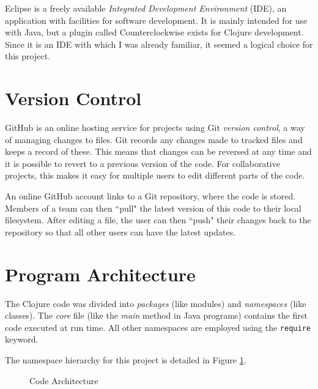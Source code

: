 Eclipse is a freely available \textit{Integrated Development Environment} (IDE), an application with facilities for software development. It is mainly intended for use with Java, but a plugin called Counterclockwise exists for Clojure development. Since it is an IDE with which I was already familiar, it seemed a logical choice for this project. 

\section{Version Control}

GitHub is an online hosting service for projects using Git \textit{version control}, a way of managing changes to files. Git records any changes made to tracked files and keeps a record of these. This means that changes can be reversed at any time and it is possible to revert to a previous version of the code. For collaborative projects, this makes it easy for multiple users to edit different parts of the code. 

An online GitHub account links to a Git repository, where the code is stored. Members of a team can then ``pull" the latest version of this code to their local filesystem. After editing a file, the user can then ``push" their changes back to the repository so that all other users can have the latest updates. 

\section{Program Architecture}

The Clojure code was divided into \textit{packages} (like modules) and \textit{namespaces} (like classes). The \textit{core} file (like the \textit{main} method in Java programs) contains the first code executed at run time. All other namespaces are employed using the \lstinline!require! keyword. 

The namespace hierarchy for this project is detailed in Figure \ref{fig:namespaceHierarchy}.



\begin{figure}[h]
\centering
{}
\caption{Code Architecture}
\label{fig:namespaceHierarchy}
\end{figure}

